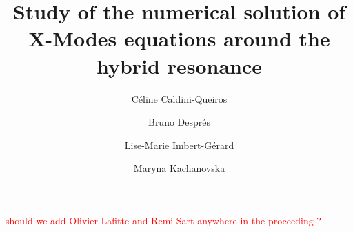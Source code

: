 \documentclass[proc]{edpsmath}
\begin{document}
\newcommand{\urev}[1]{{\color{red}#1}}
\newcommand{\mrev}[1]{{\color{blue}#1}}

\title{Study of the
	numerical solution of X-Modes equations around the hybrid resonance} %
%
\author{C\'eline Caldini-Queiros}\address{Max Planck Institute für PlasmaPhysik, Garching bei Muenchen}
\author{Bruno Despr\'es}\address{Laboratoire Jacques-Louis Lions, University PARIS 6}
\author{Lise-Marie Imbert-Gérard}\address{Courant Institute of Mathematical Sciences, New York University}
\author{Maryna Kachanovska}\address{POEMS, INRIA, ENSTA ParisTech, Paris}


%
%
\begin{abstract}

\end{abstract}
%
\begin{resume} 

\end{resume}
%
%
\maketitle
\textcolor{red}{should we add Olivier Lafitte and Remi Sart anywhere in the proceeding ?}\\


%


%



\end{document}
